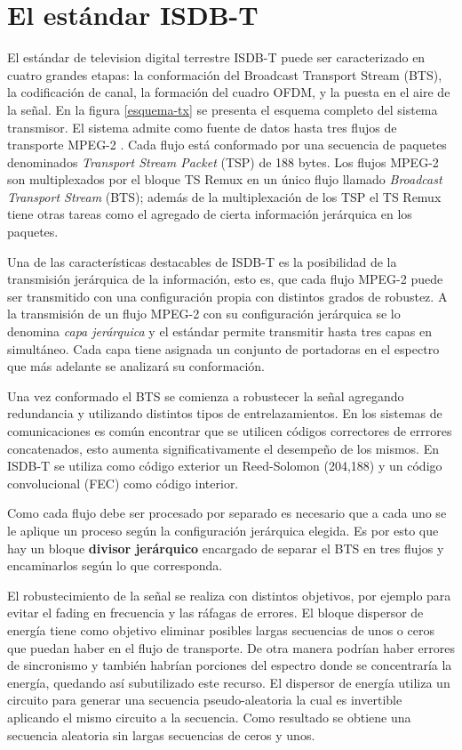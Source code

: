 \documentclass[journal,comsoc]{IEEEtran}
\begin{document}
\section{El estándar ISDB-T}
El estándar de television digital terrestre ISDB-T puede ser caracterizado en cuatro grandes etapas: la conformación del Broadcast Transport Stream (BTS), la codificación de canal, la formación del cuadro OFDM, y la puesta en el aire de la señal. En la figura \ref{esquema-tx} se presenta el esquema completo del sistema transmisor.
El sistema admite como fuente de datos hasta tres flujos de transporte MPEG-2 \cite{MPEG}. Cada flujo está conformado por una secuencia de paquetes denominados \textit{Transport Stream Packet} (TSP) de 188 bytes. Los flujos MPEG-2 son multiplexados por el bloque TS Remux en un único flujo llamado \textit{Broadcast Transport Stream} (BTS); además de la multiplexación de los TSP el TS Remux tiene otras tareas como el agregado de cierta información jerárquica en los paquetes.

Una de las características destacables de ISDB-T es la posibilidad de la transmisión jerárquica de la información, esto es, que cada flujo MPEG-2 puede ser transmitido con una configuración propia con distintos grados de robustez. A la transmisión de un flujo MPEG-2 con su configuración jerárquica se lo denomina \textit{capa jerárquica} y el estándar permite transmitir hasta tres capas en simultáneo. Cada capa tiene asignada un conjunto de portadoras en el espectro que más adelante se analizará su conformación.

Una vez conformado el BTS se comienza a robustecer la señal agregando redundancia y utilizando distintos tipos de entrelazamientos. En los sistemas de comunicaciones es común encontrar que se utilicen códigos correctores de errrores concatenados, esto aumenta significativamente el desempeño de los mismos. En ISDB-T se utiliza como código exterior un Reed-Solomon (204,188) y un código convolucional (FEC) como código interior.  

Como cada flujo debe ser procesado por separado es necesario que a cada uno se le aplique un proceso según la configuración jerárquica elegida. Es por esto que hay un bloque \textbf{divisor jerárquico} encargado de separar el BTS en tres flujos y encaminarlos según lo que corresponda.

El robustecimiento de la señal se realiza con distintos objetivos, por ejemplo para evitar el fading en frecuencia y las ráfagas de errores. El bloque dispersor de energía tiene como objetivo eliminar posibles largas secuencias de unos o ceros que puedan haber en el flujo de transporte. De otra manera podrían haber errores de sincronismo y también habrían porciones del espectro donde se concentraría la energía, quedando así subutilizado este recurso. El dispersor de energía utiliza un circuito para generar una secuencia pseudo-aleatoria la cual es invertible aplicando el mismo circuito a la secuencia. Como resultado se obtiene una secuencia aleatoria sin largas secuencias de ceros y unos.
\end{document}
